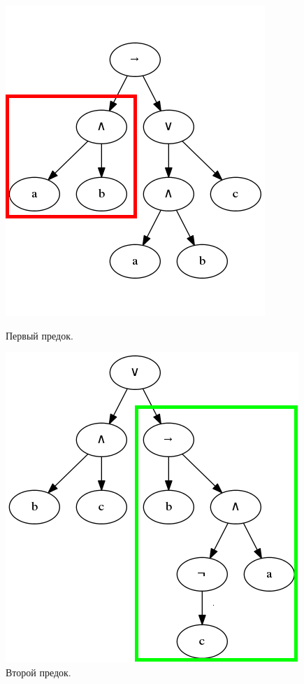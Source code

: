 \documentclass[12pt,fleqn]{article}
\begin{document}
\begin{figure}[!h]%
  \centering
  \begin{minipage}{2in}%
    \centering
    \includegraphics[scale=0.3]{t1.png}
    \caption{Первый предок.}
  \end{minipage}%
  \qquad
  \begin{minipage}{2in}%
    \centering
    \includegraphics[scale=0.3]{t2.png}
    \caption{Второй предок.}
  \end{minipage}%
\end{figure}
\end{document}
